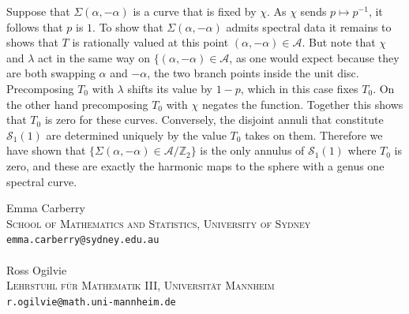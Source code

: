 \documentclass{article}
\begin{document}
Suppose that $\Sigma(\alpha,-\alpha)$ is a curve that is fixed by $\chi$. As $\chi$ sends $p \mapsto p^{-1}$, it follows that $p$ is $1$. To show that $\Sigma(\alpha,-\alpha)$ admits spectral data it remains to shows that $T$ is rationally valued at this point $(\alpha,-\alpha) \in \mathcal{A}$. But note that $\chi$ and $\lambda$ act in the same way on $\{(\alpha,-\alpha) \in \mathcal{A}$, as one would expect because they are both swapping $\alpha$ and $-\alpha$, the two branch points inside the unit disc. Precomposing $T_0$ with $\lambda$ shifts its value by $1-p$, which in this case fixes $T_0$. On the other hand precomposing $T_0$ with $\chi$ negates the function. Together this shows that $T_0$ is zero for these curves. Conversely, the disjoint annuli that constitute $\mathcal{S}_1(1)$ are determined uniquely by the value $T_0$ takes on them.
Therefore we have shown that $\{\Sigma(\alpha,-\alpha) \in \mathcal{A}/\mathbb{Z}_2\}$ is the only annulus of $\mathcal{S}_1(1)$ where $T_0$ is zero, and these are exactly the harmonic maps to the sphere with a genus one spectral curve.














Emma Carberry\\
\textsc{School of Mathematics and Statistics, University of Sydney}\\
\texttt{emma.carberry@sydney.edu.au}\\~\\
Ross Ogilvie \\
\textsc{Lehrstuhl f\"ur Mathematik III, Universit\"at Mannheim}\\
\texttt{r.ogilvie@math.uni-mannheim.de}
\end{document}
